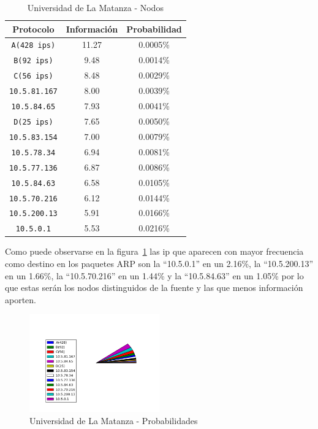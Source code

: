 \documentclass[final,inline,narroweqnarray,a4paper]{ieee}
\begin{document}
\begin{table}[H]
    \begin{center}
        \begin{tabular}{|c|c|c|}
            \hline
            \textbf{Protocolo} & \textbf{Información} & \textbf{Probabilidad} \\ \hline
            \texttt{A(428 ips)}   &11.27       & 0.0005\%     \\ \hline
            \texttt{B(92 ips)}    &9.48        & 0.0014\%     \\ \hline
            \texttt{C(56 ips)}    &8.48        & 0.0029\%     \\ \hline
	    \texttt{10.5.81.167}  &8.00        & 0.0039\%     \\ \hline
	    \texttt{10.5.84.65}   &7.93        & 0.0041\%     \\ \hline
            \texttt{D(25 ips)}    &7.65        & 0.0050\%     \\ \hline
	    \texttt{10.5.83.154}  &7.00        & 0.0079\%     \\ \hline
	    \texttt{10.5.78.34}   &6.94        & 0.0081\%     \\ \hline
	    \texttt{10.5.77.136}  &6.87        & 0.0086\%     \\ \hline
	    \texttt{10.5.84.63}   &6.58        & 0.0105\%     \\ \hline
	    \texttt{10.5.70.216}  &6.12        & 0.0144\%     \\ \hline
	    \texttt{10.5.200.13}  &5.91        & 0.0166\%     \\ \hline
	    \texttt{10.5.0.1}     &5.53        & 0.0216\%     \\ \hline
        \end{tabular}
        \caption{Universidad de La Matanza - Nodos}
        \label{table:universidadLMS1}
    \end{center}
\end{table}

Como puede observarse en la figura~\ref{torta:universidadLMS1} las ip que aparecen con mayor frecuencia como destino en los paquetes ARP son la ``10.5.0.1'' en un 2.16\%, la ``10.5.200.13'' en un 1.66\%, la ``10.5.70.216'' en un 1.44\% y la ``10.5.84.63'' en un 1.05\% por lo que estas serán los nodos distinguidos de la fuente y las que menos información aporten.

\begin{figure}[H]
    \begin{center}
        \includegraphics[width=0.5\textwidth]{plot/facultadS1_v3-pie.png}
        \caption{Universidad de La Matanza - Probabilidades}
        \label{torta:universidadLMS1}
    \end{center}
\end{figure} 
\end{document}
